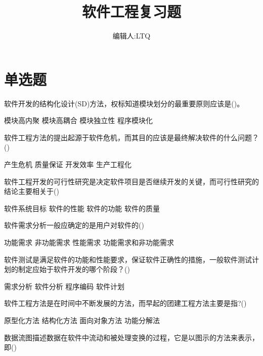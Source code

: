 \documentclass{exam}
\title{软件工程复习题}
\author{编辑人:LTQ}
\date{}
\begin{document}
\maketitle
\section{单选题}
\begin{questions}
	\question 软件开发的结构化设计(SD)方法，权标知道模块划分的最重要原则应该是()。\\
	\begin{oneparchoices}
		\choice 模块高内聚
		\choice 模块高耦合
		\correctchoice 模块独立性
		\choice 程序模块化
	\end{oneparchoices}
	\question 软件工程方法的提出起源于软件危机，而其目的应该是最终解决软件的什么问题？()\\
	\begin{oneparchoices}
		\choice 产生危机
		\choice 质量保证
		\choice 开发效率
		\correctchoice 生产工程化
	\end{oneparchoices}
	\question 软件工程开发的可行性研究是决定软件项目是否继续开发的关键，而可行性研究的结论主要相关于()\\
	\begin{oneparchoices}
		\correctchoice 软件系统目标
		\choice 软件的性能
		\choice 软件的功能
		\choice 软件的质量
	\end{oneparchoices}
	\question 软件需求分析一般应确定的是用户对软件的()\\
	\begin{oneparchoices}
		\choice 功能需求
		\choice 非功能需求
		\choice 性能需求
		\correctchoice 功能需求和非功能需求
	\end{oneparchoices}
	\question 软件测试是满足软件的功能和性能要求，保证软件正确性的措施，一般软件测试计划的制定应始于软件开发的哪个阶段？()\\
	\begin{oneparchoices}
		\correctchoice 需求分析
		\choice 软件分析
		\choice 程序编码
		\choice 软件计划
	\end{oneparchoices}
	\question 软件工程方法是在时间中不断发展的方法，而早起的团建工程方法主要是指?()\\
	\begin{oneparchoices}
		\choice 原型化方法
		\correctchoice 结构化方法
		\choice 面向对象方法
		\choice 功能分解法
	\end{oneparchoices}
	\question 数据流图描述数据在软件中流动和被处理变换的过程，它是以图示的方法来表示，即()\\
	\begin{oneparchoices}

\end{oneparchoices}
\end{questions}
\end{document}
